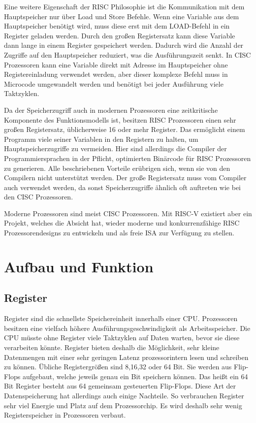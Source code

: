 \documentclass[a4paper,12pt]{article}
\begin{document}
\noindent Eine weitere Eigenschaft der RISC Philosophie ist die Kommunikation mit dem Hauptspeicher nur über Load und Store Befehle. Wenn eine Variable aus dem Hauptspeicher benötigt wird, muss diese erst mit dem LOAD-Befehl in ein Register geladen werden. Durch den großen Registersatz kann diese Variable dann lange in einem Register gespeichert werden. Dadurch wird die Anzahl der Zugriffe auf den Hauptspeicher reduziert, was die Ausführungszeit senkt. In CISC Prozessoren kann eine Variable direkt mit Adresse im Hauptspeicher ohne Registereinladung verwendet werden, aber dieser komplexe Befehl muss in Microcode umgewandelt werden und benötigt bei jeder Ausführung viele Taktzyklen.\cite[S.102]{mikroprozessortechnik2011}

\par \bigskip
\noindent Da der Speicherzugriff auch in modernen Prozessoren eine zeitkritische Komponente des Funktionsmodells ist, besitzen RISC Prozessoren einen sehr großen Registersatz, üblicherweise 16 oder mehr Register. Das ermöglicht einem Programm viele seiner Variablen in den Registern zu halten, um Hauptspeicherzugriffe zu vermeiden. Hier sind allerdings die Compiler der Programmiersprachen in der Pflicht, optimierten Binärcode für RISC Prozessoren zu generieren. Alle beschriebenen Vorteile erübrigen sich, wenn sie von den Compilern nicht unterstützt werden. Der große Registersatz muss vom Compiler auch verwendet werden, da sonst Speicherzugriffe ähnlich oft auftreten wie bei den CISC Prozessoren. \cite[S.102]{mikroprozessortechnik2011}
\par \bigskip
\noindent Moderne Prozessoren sind meist CISC Prozessoren. Mit RISC-V existiert aber ein Projekt, welches die Absicht hat, wieder moderne und konkurrenzfähige RISC Prozessorendesigns zu entwickeln und als freie ISA zur Verfügung zu stellen. 

\newpage
\section{Aufbau und Funktion}
\subsection{Register} \label{sub:register}
Register sind die schnellste Speichereinheit innerhalb einer CPU. Prozessoren besitzen eine vielfach höhere Ausführungsgeschwindigkeit als Arbeitsspeicher. Die CPU müsste ohne Register viele Taktzyklen auf Daten warten, bevor sie diese verarbeiten könnte.%
 Register bieten deshalb die Möglichkeit, sehr kleine Datenmengen mit einer sehr geringen Latenz prozessorintern lesen und schreiben zu können. Übliche Registergrößen sind 8,16,32 oder 64 Bit.\cite{mikroprozessortechnik2011} Sie werden aus Flip-Flops aufgebaut, welche jeweils genau ein Bit speichern können. Das heißt ein 64 Bit Register besteht aus 64 gemeinsam gesteuerten Flip-Flops.\cite{mikroprozessortechnik2011} Diese Art der Datenspeicherung hat allerdings auch einige Nachteile. So verbrauchen Register sehr viel Energie und Platz auf dem Prozessorchip. Es wird deshalb sehr wenig Registerspeicher in Prozessoren verbaut.
\end{document}

